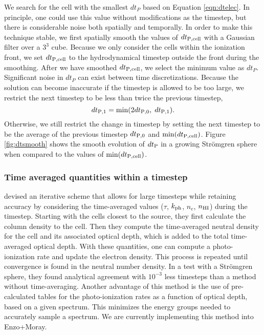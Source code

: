 \documentclass[apj,onecolumn]{emulateapj}
\begin{document}
We search for the cell with the smallest $dt_P$ based on Equation
\ref{eqn:dtelec}.  In principle, one could use this value without
modifications as the timestep, but there is considerable noise both
spatially and temporally.  In order to make this technique stable, we
first spatially smooth the values of $dt_{\rm P,cell}$ with a Gaussian
filter over a $3^3$ cube.  Because we only consider the cells within
the ionization front, we set $dt_{\rm P,cell}$ to the hydrodynamical
timestep outside the front during the smoothing.  After we have
smoothed $dt_{\rm P,cell}$, we select the minimum value as $dt_P$.
Significant noise in $dt_P$ can exist between time discretizations.
Because the solution can become inaccurate if the timestep is allowed
to be too large, we restrict the next timestep to be less than twice
the previous timestep,
%
\begin{equation}
  \label{eqn:dtchange}
  dt_{\rm P,1} = \min(2 dt_{\rm P,0},\; dt_{\rm P,1}).
\end{equation}
Otherwise, we still restrict the change in timestep by setting the
next timestep to be the average of the previous timestep $dt_{\rm
  P,0}$ and $\min(dt_{\rm P,cell})$.  Figure \ref{fig:dtsmooth} shows
the smooth evolution of $dt_{\rm P}$ in a growing Str\"{o}mgren sphere when
compared to the values of $\min(dt_{\rm P,cell})$.

\subsubsection{Time averaged quantities within a timestep}

\citet{Mellema06} devised an iterative scheme that allows for large
timesteps while retaining accuracy by considering the time-averaged
values ($\tau$, $k_{\rm ph}$, $n_e$, $n_{\rm HI}$) during the
timestep.  Starting with the cells closest to the source, they first
calculate the column density to the cell.  Then they compute the
time-averaged neutral density for the cell and its associated optical
depth, which is added to the total time-averaged optical depth.  With
these quantities, one can compute a photo-ionization rate and update
the electron density.  This process is repeated until convergence is
found in the neutral number density.  In a test with a Str\"{o}mgren
sphere, they found analytical agreement with $10^{-3}$ less timesteps
than a method without time-averaging.  Another advantage of this
method is the use of pre-calculated tables for the photo-ionization
rates as a function of optical depth, based on a given spectrum.  This
minimizes the energy groups needed to accurately sample a spectrum.
We are currently implementing this method into Enzo+Moray.
\end{document}
